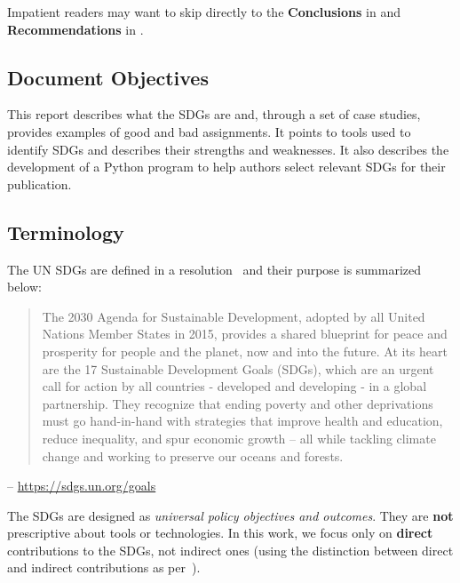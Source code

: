 Impatient readers may want to skip directly to the \textbf{Conclusions} in  and \textbf{Recommendations} in .

\subsection{Document Objectives}
\label{sec:intro_structure}

This report describes what the \glspl{SDG} are and, through a set of case studies, provides examples of good and bad assignments. It points to tools used to identify \glspl{SDG} and describes their strengths and weaknesses. It also describes the development of a Python program to help authors select relevant \glspl{SDG} for their publication.

\subsection{Terminology}
\label{sec:Terminology}
The \gls{UN} \glspl{SDG} are defined in a resolution~\cite{un2015transforming} and their purpose is summarized below:
\begin{quote}
The 2030 Agenda for Sustainable Development, adopted by all United Nations Member States in 2015, provides a shared blueprint for peace and prosperity for people and the planet, now and into the future. At its heart are the 17 Sustainable Development Goals (SDGs), which are an urgent call for action by all countries - developed and developing - in a global partnership. They recognize that ending poverty and other deprivations must go hand-in-hand with strategies that improve health and education, reduce inequality, and spur economic growth – all while tackling climate change and working to preserve our oceans and forests.
\end{quote}
\begin{flushright}
-- \href{https://sdgs.un.org/goals}{https://sdgs.un.org/goals}
\end{flushright}

The \glspl{SDG} are designed as \textit{universal policy objectives and outcomes}. They are \textbf{not} prescriptive about tools or technologies. In this work, we focus only on \textbf{direct} contributions to the \glspl{SDG}, not indirect ones (using the distinction between direct and indirect contributions as per~\cite{armitage_mapping_2020}).

